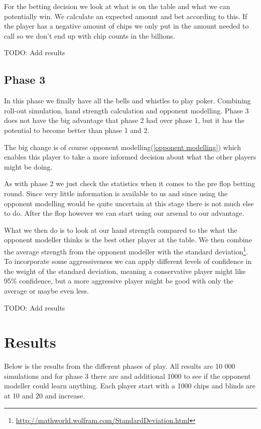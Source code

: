 \documentclass[titlepage, a4paper]{article}
\begin{document}
For the betting decision we look at what is on the table and what we can potentially
win. We calculate an expected amount and bet according to this. If the player has a negative
amount of chips we only put in the amount needed to call so we don't end up with chip counts in the
billions.

TODO: Add results

\subsection{Phase 3}\label{phase 3 player}
In this phase we finally have all the bells and whistles to play poker. Combining
roll-out simulation, hand strength calculation and opponent modelling. Phase 3 does
not have the big advantage that phase 2 had over phase 1, but it has the potential
to become better than phase 1 and 2.

The big change is of course opponent modelling(\ref{opponent modelling}) which enables
this player to take a more informed decision about what the other players might be
doing.

As with phase 2 we just check the statistics when it comes to the pre flop betting round.
Since very little information is available to us and since using the opponent modelling
would be quite uncertain at this stage there is not much else to do. After the
flop however we can start using our arsenal to our advantage.

What we then do is
to look at our hand strength compared to the what the opponent modeller thinks is
the best other player at the table. We then combine the average strength from the
opponent modeller with the standard deviation\footnote{\url{http://mathworld.wolfram.com/StandardDeviation.html}}. To incorporate some aggressiveness we can apply different levels of confidence
in the weight of the standard deviation, meaning a conservative player might like
95\% confidence, but a more aggressive player might be good with only the average
or maybe even less.

TODO: Add results
 
\section{Results}\label{results}
Below is the results from the different phases of play. All results are 10 000 simulations
and for phase 3 there are and additional 1000 to see if the opponent modeller could learn
anything. Each player start with a 1000 chips and blinds are at 10 and 20 and increase.
\end{document}
